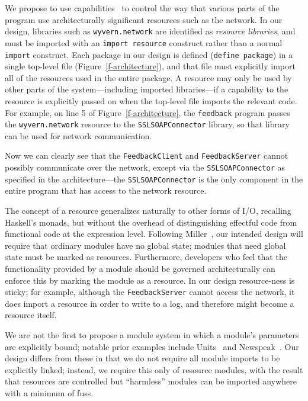 \documentclass[runningheads]{llncs}
\begin{document}
\begin{sloppypar}
We propose to use capabilities~\cite{Wulf:1974:HKM:355616.364017} to control the way that various parts of the program use architecturally significant resources such as the network.  In our design, libraries such as \texttt{wyvern.network} are identified as \emph{resource libraries}, and must be imported with an \texttt{import resource} construct rather than a normal \texttt{import} construct.  Each package in our design is defined (\texttt{define package}) in a single top-level file (Figure~\ref{f-architecture}), and that file must explicitly import all of the resources used in the entire package.  A resource may only be used by other parts of the system---including imported libraries---if a capability to the resource is explicitly passed on when the top-level file imports the relevant code.  For example, on line 5 of Figure~\ref{f-architecture}, the \texttt{feedback} program passes the \texttt{wyvern.network} resource to the \texttt{SSLSOAPConnector} library, so that library can be used for network communication.

Now we can clearly see that the \texttt{FeedbackClient} and \texttt{FeedbackServer} cannot possibly communicate over the network, except via the \texttt{SSLSOAPConnector} as specified in the architecture---the \texttt{SSLSOAPConnector} is the only component in the entire program that has access to the network resource.

The concept of a resource generalizes naturally to other forms of I/O, recalling Haskell's monads, but without the overhead of distinguishing effectful code from functional code at the expression level.  Following Miller~\cite{MarkMiller-E}, our intended design will require that ordinary modules have no global state; modules that need global state must be marked as resources.  Furthermore, developers who feel that the functionality provided by a module should be governed architecturally can enforce this by marking the module as a resource.  In our design resource-ness is sticky; for example, although the \texttt{FeedbackServer} cannot access the network, it does import a resource in order to write to a log, and therefore might become a resource itself.

We are not the first to propose a module system in which a module's parameters are explicitly bound; notable prior examples include Units~\cite{FF98} and Newspeak~\cite{BrachaNewspeakModules}.  Our design differs from these in that we do not require all module imports to be explicitly linked; instead, we require this only of resource modules, with the result that resources are controlled but ``harmless'' modules can be imported anywhere with a minimum of fuss.


\end{sloppypar}
\end{document}
